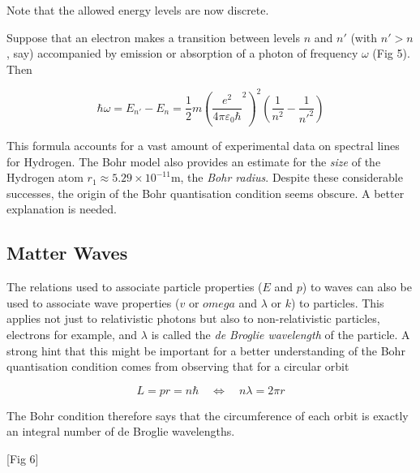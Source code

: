 \documentclass[a4paper]{article}
\begin{document}
Note that the allowed energy levels are now discrete. 

Suppose that an electron makes a transition between levels $ n $ and $ n' $ (with $ n' > n $, say) accompanied by emission or absorption of a photon of frequency $ \omega $ (Fig 5). Then

\[ \hbar \omega = E_{n'} - E_{n} = \frac{1}{2}m\left( \frac{e^{2}}{4 \pi \varepsilon_{0} \hbar }^{2} \right)^{2} \left( \frac{1}{n^{2}} - \frac{1}{n'^{2}} \right)   \]
 

\begin{center}
\end{center}

This formula accounts for a vast amount of experimental data on spectral lines for Hydrogen. The Bohr model also provides an estimate for the \emph{size} of the Hydrogen atom $ r_{1} \approx 5.29 \times 10^{-11} \text{m} $, the \emph{Bohr radius}. Despite these considerable successes, the origin of the Bohr quantisation condition seems obscure. A better explanation is needed.

\subsection{Matter Waves}

The relations used to associate particle properties ($ E $ and $ p $) to waves can also be used to associate wave properties ($ v $ or $ omega $ and $ \lambda $ or $ k $) to particles. This applies not just to relativistic photons but also to non-relativistic particles, electrons for example, and $ \lambda $ is called the \emph{de Broglie wavelength} of the particle. A strong hint that this might be important for a better understanding of the Bohr quantisation condition comes from observing that for a circular orbit

\[ L = pr = n \hbar \quad \iff \quad n \lambda = 2 \pi r \]

The Bohr condition therefore says that the circumference of each orbit is exactly an integral number of de Broglie wavelengths. 

[Fig 6]
\end{document}
